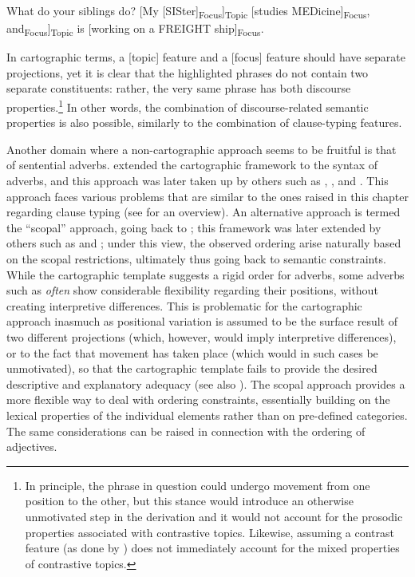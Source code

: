 \begin{exe}
\ex
\begin{xlist} 
 What do your siblings do?
 {[}My [SISter]\textsubscript{Focus}]\textsubscript{Topic} [studies MEDicine]\textsubscript{Focus}, and\newline [my [BROther]\textsubscript{Focus}]\textsubscript{Topic} is [working on a FREIGHT ship]\textsubscript{Focus}.
\end{xlist}
\end{exe}

In cartographic terms, a [topic] feature and a [focus] feature should have separate projections, yet it is clear that the highlighted phrases do not contain two separate constituents: rather, the very same phrase has both discourse properties.\footnote{In principle, the phrase in question could undergo movement from one position to the other, but this stance would introduce an otherwise unmotivated step in the derivation and it would not account for the prosodic properties associated with contrastive topics. Likewise, assuming a contrast feature (as done by \citealt{frascarellihinterhoelzl2007}) does not immediately account for the mixed properties of contrastive topics.} In other words, the combination of discourse-related semantic properties is also possible, similarly to the combination of clause-typing features.

Another domain where a non-cartographic approach seems to be fruitful is that of sentential adverbs. \citet{cinque1999} extended the cartographic framework to the syntax of adverbs, and this approach was later taken up by others such as \citet{alexiadou1997}, \citet{laenzlinger2004}, and \citet{haumann2007}. This approach faces various problems that are similar to the ones raised in this chapter regarding clause typing (see \citealt{ernst2014} for an overview). An alternative approach is termed the ``scopal'' approach, going back to \citet{jackendoff1972}; this framework was later extended by others such as \citet{ernst1984, ernst2002} and \citet{haider1998, haider2000, haider2004}; under this view, the observed ordering arise naturally based on the scopal restrictions, ultimately thus going back to semantic constraints. While the cartographic template suggests a rigid order for adverbs, some adverbs such as \textit{often} show considerable flexibility regarding their positions, without creating interpretive differences. This is problematic for the cartographic approach inasmuch as positional variation is assumed to be the surface result of two different projections (which, however, would imply interpretive differences), or to the fact that movement has taken place (which would in such cases be unmotivated), so that the cartographic template fails to provide the desired descriptive and explanatory adequacy (see also \citealt[119--120]{ernst2014}). The scopal approach provides a more flexible way to deal with ordering constraints, essentially building on the lexical properties of the individual elements rather than on pre-defined categories. The same considerations can be raised in connection with the ordering of adjectives.

